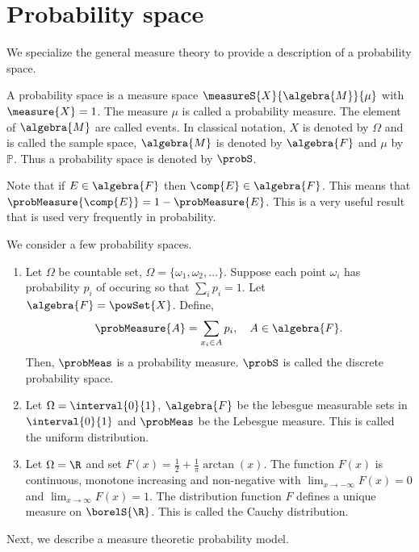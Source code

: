 \chapter{Probability space}
We specialize the general measure theory to provide a description of a probability space.

\begin{Definition}[name=Probability space]
    A probability space  is a measure space $\measureS{X}{\algebra{M}}{\mu}$ with $\measure{X} = 1$. The
    measure $\mu$ is called a probability measure. The element of $\algebra{M}$ are called events.
    In classical notation, $X$ is denoted by $\Omega$ and is called the sample space, 
    $\algebra{M}$ is denoted by $\algebra{F}$ and
    $\mu$ by $\mathbb{P}$. Thus a probability space is denoted by $\probS$.
\end{Definition}
Note that if $E \in \algebra{F}$ then $\comp{E} \in \algebra{F}$. This means that
$\probMeasure{\comp{E}} = 1 - \probMeasure{E}$. This is a very useful result that is used very
frequently in probability.
\begin{Example}
    We consider a few probability spaces.
    \begin{enumerate}
	\item
	    Let $\Omega$ be countable set, $\Omega = \lbrace\omega_1,\omega_2,\dots\rbrace$. Suppose each
	    point $\omega_i$ has probability $p_i$ of occuring so that $\sum\limits_{i}p_i = 1$. Let
	    $\algebra{F} = \powSet{X}$. Define,
	    \[\probMeasure{A} = \sum\limits_{x_i\in A}p_i,\quad A\in\algebra{F}.\]
	    Then, $\probMeas$ is a probability measure. $\probS$ is called
	    the discrete probability space.
	\item
	    Let $\Omega = \interval{0}{1}$, $\algebra{F}$ be the lebesgue measurable sets in
	    $\interval{0}{1}$ and $\probMeas$ be the Lebesgue measure. This is called the uniform
	    distribution. 
	\item
	    Let $\Omega = \R$ and set $F(x) = \frac{1}{2} + \frac{1}{\pi}\arctan(x)$. The function
	    $F(x)$ is continuous, monotone increasing and non-negative with 
	    $\lim_{x\to-\infty}F(x) = 0$ and  $\lim_{x\to\infty}F(x) = 1$. The distribution function
	    $F$ defines a unique measure on $\borelS{\R}$. This is called the Cauchy distribution.
    \end{enumerate}
\end{Example}
Next, we describe a measure theoretic probability model.

